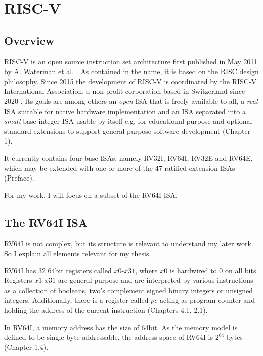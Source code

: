 \chapter{RISC-V}\label{chap:riscv}

\section{Overview}

RISC-V is an open source instruction set architecture first published in May 2011 by A. Waterman et al. \cite{first_riscv}.
As contained in the name, it is based on the RISC design philosophy. 
Since 2015 the development of RISC-V is coordinated by the RISC-V International Association,
a non-profit corporation based in Switzerland since 2020 \cite{riscvorg}.
Its goals are among others an \emph{open} ISA that is freely available to all,
a \emph{real} ISA suitable for native hardware implementation and
an ISA separated into a \emph{small} base integer ISA usable by itself e.g. for educational purpose
and optional standard extensions to support general purpose software development \cite{riscv-isa}(Chapter 1).

It currently contains four base ISAs, namely RV32I, RV64I, RV32E and RV64E,
which may be extended with one or more of the 47 ratified extension ISAs \cite{riscv-isa} (Preface).

 

For my work, I will focus on a subset of the RV64I ISA.

\section{The RV64I ISA}
RV64I is not complex, but its structure is relevant to understand my later work.
So I explain all elements relevant for my thesis.

RV64I has 32 64bit registers called $x0$-$x31$, where $x0$ is hardwired to 0 on all bits.
Registers $x1$-$x31$ are general purpose and are interpreted by various instructions as a collection of booleans, two's complement signed binary integers or unsigned integers.
Additionally, there is a register called $pc$ acting as program counter and holding the address of the current instruction \cite{riscv-isa}(Chapters 4.1, 2.1).

In RV64I, a memory address has the size of 64bit. As the memory model is defined to be single byte addressable,
the address space of RV64I is $2^{64}$ bytes \cite{riscv-isa}(Chapter 1.4).

